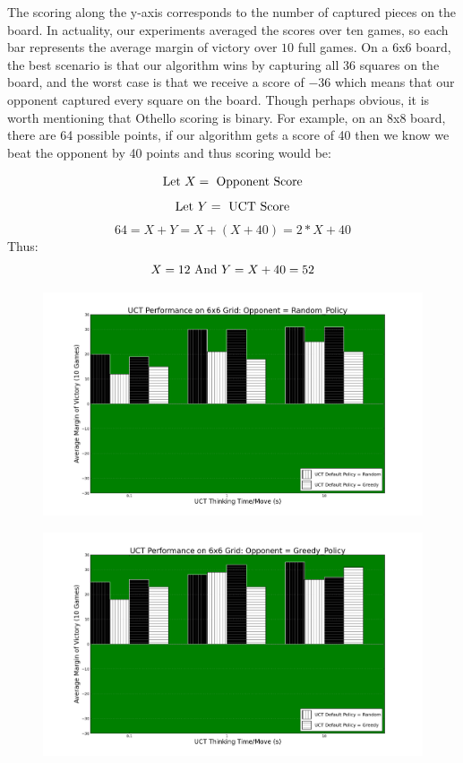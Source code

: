 \documentclass[12pt,letterpaper]{article}
\begin{document}
The scoring along the y-axis corresponds to the number of captured pieces on the board. In actuality, our experiments averaged the scores over ten games, so each bar represents the average margin of victory over $10$ full games. On a 6x6 board, the best scenario is that our algorithm wins by capturing all $36$ squares on the board, and the worst case is that we receive a score of $-36$ which means that our opponent captured every square on the board. Though perhaps obvious, it is worth mentioning that Othello scoring is binary. For example, on an 8x8 board, there are 64 possible points, if our algorithm gets a score of 40 then we know we beat the opponent by 40 points and thus scoring would be:
\begin{center}
$$\textnormal{Let } X = \textnormal{ Opponent Score} $$
$$\textnormal{Let } Y = \textnormal{ UCT Score} $$
$$ 64 = X+Y = X+(X+40) = 2*X + 40$$ 
Thus:
$$ X = 12 \textnormal{  And   } Y = X+40 = 52$$ 
\end{center}

\begin{figure}[!hp]
\begin{center}
\includegraphics[scale=.4]{66_Random_Policy}
\end{center}
\end{figure}

\begin{figure}[!hp]
\begin{center}
\includegraphics[scale=.4]{66_Greedy_Policy}
\end{center}
\end{figure}
\end{document}
